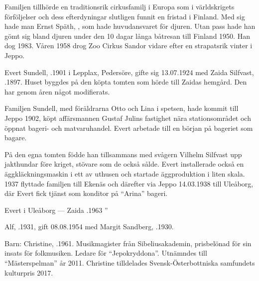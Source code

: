 Familjen tillhörde en traditionsrik cirkusfamilj i Europa som i världskrigets förföljelser och dess efterdyningar slutligen funnit en fristad i Finland. Med sig hade man Ernst Späth, , som hade huvudansvaret för djuren. Utan pass hade han gömt sig bland djuren under den 10 dagar långa båtresan till Finland 1950. Han dog 1983. Våren 1958 drog Zoo Cirkus Sandor vidare efter en strapatsrik vinter i Jeppo.


Evert Sundell, .1901 i Lepplax, Pedersöre, gifte sig 13.07.1924 med Zaida Silfvast, .1897. Huset byggdes på den köpta tomten som hörde till Zaidas hemgård. Den har genom åren något modifierats.

Familjen Sundell, med föräldrarna Otto och Lina i spetsen, hade kommit till Jeppo 1902, köpt affärsmannen Gustaf Julins fastighet nära stationsområdet och öppnat bageri- och matvaruhandel. Evert arbetade till en början på bageriet som bagare.

På den egna tomten födde han tillsammans med svågern Vilhelm Silfvast upp jakthundar före kriget, stövare som de också sålde. Evert installerade också en äggkläckningsmaskin i ett av uthusen och startade äggproduktion i liten skala. 1937 flyttade familjen till Ekenäs och därefter via Jeppo 14.03.1938 till Uleåborg, där Evert fick tjänst som konditor på ``Arina'' bageri.
\begin{jhchildren}
  \item {}
  \item {}
  \item {}
\end{jhchildren}
Evert  i Uleåborg  ---  Zaida .1963         ”






Alf, .1931, gift 08.08.1954 med Margit Sandberg, .1930.

Barn: Christine, .1961. Musikmagister från Sibeliusakademin, prisbelönad för sin insats för folkmusiken. Ledare för ``Jepokryddona''. Utnämndes till ``Mästerspelman'' år 2011. Christine tilldelades Svensk-Österbottniska samfundets kulturpris 2017.

